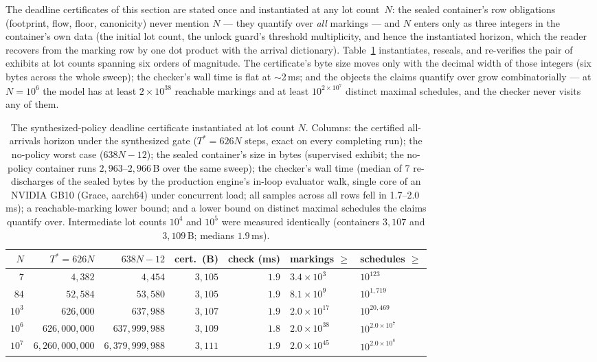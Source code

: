 The deadline certificates of this section are stated once and
instantiated at any lot count~$N$: the sealed container's row
obligations (footprint, flow, floor, canonicity) never mention $N$
--- they quantify over \emph{all} markings --- and $N$ enters only
as three integers in the container's own data (the initial lot
count, the unlock guard's threshold multiplicity, and hence the
instantiated horizon, which the reader recovers from the marking
row by one dot product with the arrival dictionary).
Table~\ref{tab:minifab-nscaling} instantiates, reseals, and
re-verifies the pair of exhibits at lot counts spanning six orders
of magnitude. The certificate's byte size moves only with the
decimal width of those integers (six bytes across the whole sweep);
the checker's wall time is flat at $\sim$2\,ms; and the objects the
claims quantify over grow combinatorially --- at $N = 10^{6}$ the
model has at least $2\times10^{38}$ reachable markings and at least
$10^{2\times10^{7}}$ distinct maximal schedules, and the checker
never visits any of them.

\begin{table}[t]
\centering
\small
\begin{tabular}{@{}rrrrrll@{}}
\toprule
$N$ & $T^{*}=626N$ & $638N-12$ & cert.\ (B) & check (ms) &
markings $\geq$ & schedules $\geq$ \\
\midrule
$7$      & $4{,}382$         & $4{,}454$         & $3{,}105$ & $1.9$ & $3.4\times10^{3}$  & $10^{123}$ \\
$84$     & $52{,}584$        & $53{,}580$        & $3{,}105$ & $1.9$ & $8.1\times10^{9}$  & $10^{1{,}719}$ \\
$10^{3}$ & $626{,}000$       & $637{,}988$       & $3{,}107$ & $1.9$ & $2.0\times10^{17}$ & $10^{20{,}469}$ \\
$10^{6}$ & $626{,}000{,}000$ & $637{,}999{,}988$ & $3{,}109$ & $1.8$ & $2.0\times10^{38}$ & $10^{2.0\times10^{7}}$ \\
$10^{7}$ & $6{,}260{,}000{,}000$ & $6{,}379{,}999{,}988$ & $3{,}111$ & $1.9$ & $2.0\times10^{45}$ & $10^{2.0\times10^{8}}$ \\
\bottomrule
\end{tabular}
\caption{The synthesized-policy deadline certificate instantiated
at lot count $N$. Columns: the certified all-arrivals horizon under
the synthesized gate ($T^{*} = 626N$ steps, exact on every
completing run); the no-policy worst case ($638N-12$); the sealed
container's size in bytes (supervised exhibit; the no-policy
container runs $2{,}963$--$2{,}966$\,B over the same sweep); the
checker's wall time (median of 7 re-discharges of the sealed bytes
by the production engine's in-loop evaluator walk, single core of
an NVIDIA GB10 (Grace, aarch64) under concurrent load; all samples
across all rows fell in 1.7--2.0\,ms); a reachable-marking lower
bound; and a lower bound on distinct maximal schedules the claims
quantify over. Intermediate lot counts $10^{4}$ and $10^{5}$ were
measured identically (containers $3{,}107$ and $3{,}109$\,B;
medians $1.9$\,ms).}
\label{tab:minifab-nscaling}
\end{table}

